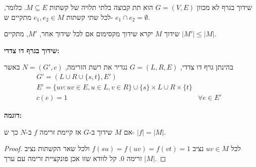 שידוך בגרף לא מכוון
$G = (V, E)$
הוא תת קבוצה בלתי תלויה של קשתות 
$M \subseteq E$.
כלומר, לכל שתי קשתות 
$e_1, e_2 \in M$
מתקיים ש-%
$e_1 \cap e_2 = \emptyset$.

\begin{definition}
שידוך $M$ יקרא שידוך מקסימום אם לכל שידוך אחר,
$M'$,
מתקיים
$|M'| \leq |M|$.
\end{definition}

\textbf{שידוך בגרף דו צדדי:}

בהינתן גרף דו צדדי,
$G = (L, R, E)$
נגדיר את רשת הזרימה,
$N = (G', c)$
כאשר
$$
\begin{array}{ll}
G' = (L \cup R \cup \{s, t\}, E')
\\
E' = \{uv : uv \in E, u \in L, v \in R\} \cup \{s\} \times L \cup R \times \{t\}
\\
c(e) = 1 & \forall e \in E'
\end{array}
$$

\textbf{דוגמה:}

\begin{center}
\end{center}


\begin{claim}
אם $M$ שידוך ב-$G$ אז קיימת זרימה $f$ ב-$N$ כך ש-%
$|f| = |M|$.

\begin{proof}
לכל 
$uv \in M$
נציב
$f(su) = f(uv) = f(vt) = 1$
ולכל שאר הקשתות נציב זרימה 0.
קל לוודא שזו אכן פונקציית זרימה עם ערך 
$|M|$.
\end{proof}
\end{claim}

